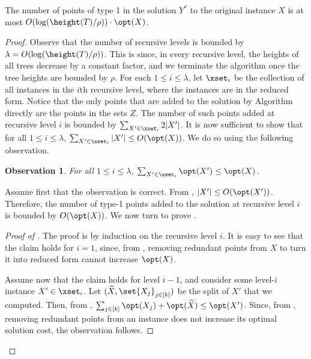\documentclass{toc}
\newtheorem{myobs}[theorem]{Observation}
\begin{document}
\begin{claim}\label{claim: type 1 points}
	The number of points of type 1 in the solution $Y^*$ to the original instance $X$ is at most $O(\log(\height(T)/\rho))\cdot \opt(X)$.
	\end{claim}

\begin{proof}
	Observe that the number of recursive levels is bounded by $\lambda =O(\log(\height(T)/\rho))$. 
	This is since, in every recursive level, the heights of all trees decrease by a constant factor, and we terminate the algorithm once the tree heights are bounded by $\rho$.
	 For each $1\leq i\leq \lambda$, let $\xset_i$ be the collection of all instances in the $i$th recursive level, where the instances are in the reduced form. Notice that the only points that are added to the solution by Algorithm \recBST directly are the points in the sets $Z$. The number of such points added at recursive level $i$ is bounded by $\sum_{X'\in \xset_i}2|X'|$. It is now sufficient to show that for all $1\leq i\leq \lambda$, $\sum_{X'\in \xset_i}|X'|\leq O(\opt(X))$. We do so using the following observation.
	
	\begin{myobs}\label{obs: type 1 points}
		For all $1\leq i\leq \lambda$, $\sum_{X'\in \xset_i}\opt(X')\leq \opt(X)$.
		\end{myobs}
	
	Assume first that the observation is correct. From , $|X'|\leq O(\opt(X'))$. Therefore, the number of type-1 points added to  the solution at recursive level $i$ is bounded by $O(\opt(X))$.
We now turn to prove .
\begin{proof}[Proof of ]
	The proof is by induction on the recursive level $i$. It is easy to see that the claim holds for $i=1$, since, from , removing redundant points from $X$ to turn it into reduced form cannot increase $\opt(X)$.
	
	Assume now that the claim holds for level $i-1$, and consider some level-$i$ instance $X'\in \xset_i$. Let $(\widetilde{X},\set{X_j}_{j \in [k]})$ be the split of  $X'$ that we computed. Then, from  , $\sum_{j \in [k]}\opt(X_j) + \opt(\widetilde{X}) \leq \opt(X')$. Since, from , removing redundant points from an instance does not increase its optimal solution cost, the observation follows.
\end{proof}		 
\end{proof}
\end{document}
